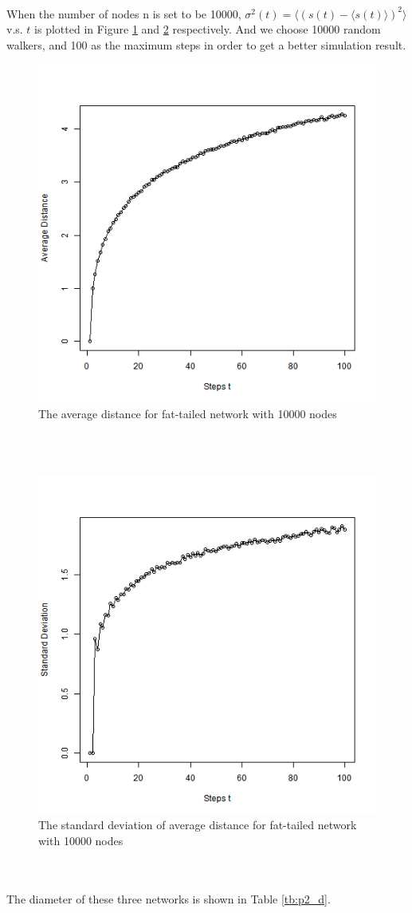 \documentclass{article}
\begin{document}
\\
When the number of nodes n is set to be 10000, $\sigma^2(t)=\langle (s(t)-\langle s(t)\rangle)^2\rangle$ v.s. $t$ is plotted in Figure \ref{fig:p2_d3} and \ref{fig:p2_d4} respectively. And we choose 10000 random walkers, and 100 as the maximum steps in order to get a better simulation result.
\begin{figure}[htbp]
\centering
\includegraphics[width=.6\textwidth]{Q2d_1_10000.png}
\caption{The average distance for fat-tailed network with 10000 nodes}
\label{fig:p2_d3}
\end{figure}\\
\\
\begin{figure}[htbp]
\centering
\includegraphics[width=.6\textwidth]{Q2d_2_10000.png}
\caption{The standard deviation of average distance for fat-tailed network with 10000 nodes}
\label{fig:p2_d4}
\end{figure}\\
\\
The diameter of these three networks is shown in Table \ref{tb:p2_d}.
\end{document}
